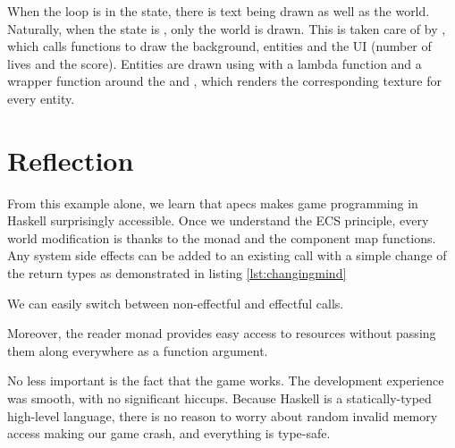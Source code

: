 \documentclass[
  digital, %
  color,   %
  table,   %
  oneside, %
  lof,     %
  lot,     %
]{fithesis3}
\begin{document}
When the loop is in the  state, there is text being drawn
as well as the world. Naturally, when the state is ,
only the world is drawn. This is taken care of by ,
which calls functions to draw the background, entities and the UI
(number of lives and the score). Entities are drawn using 
with a lambda function and a wrapper function around the  and
, which renders the corresponding texture for every entity.


\section{Reflection}
\label{sect:apecsreflection}

From this example alone,
we learn that apecs makes game programming in Haskell surprisingly accessible.
Once we understand the ECS principle, every world modification is
 thanks to the  monad and
the component map functions. Any system side effects can be added
to an existing  call with a simple change of the return types
as demonstrated in listing \ref{lst:changingmind}
\begin{listing}[H]
\caption{We can easily switch between non-effectful and effectful calls.}
\label{lst:changingmind}
\end{listing}

Moreover, the  reader monad provides easy
access to resources without passing them along everywhere as a function argument.

No less important is the fact that the game works.
The development experience was smooth, with no significant hiccups.
Because Haskell is a statically-typed high-level language, there is
no reason to worry about random invalid memory access making our game crash,
and everything is type-safe.
\end{document}
